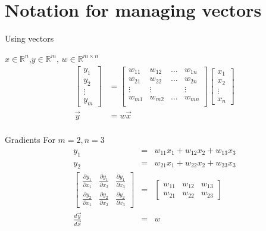 \section{Notation for managing vectors}
\begin{frame}{Using vectors}
		\begin{block}{$x \in \mathbb{R}^n$,$y \in \mathbb{R}^m$, $w\in \mathbb{R}^{m \times n}$}
			\begin{align*}
				\begin{bmatrix}
					y_1 \\
					y_2 \\
					\vdots \\
					y_m
				\end{bmatrix} & =  
				\begin{bmatrix}
					w_{11} & w_{12}& \dots & w_{1n}  \\
					w_{21} & w_{22}& \dots & w_{2n}  \\
					\vdots &\vdots &  & \vdots  \\
					w_{m1} & w_{m2}& \dots & w_{mn}  \\
				\end{bmatrix}
			\begin{bmatrix}
				x_1 \\
				x_2 \\
				\vdots \\
				x_n
			\end{bmatrix} \\
		\vec{y} &=w\vec{x} \\
			\end{align*}

		\end{block}
\end{frame}
\begin{frame}{Gradients}
	For $m=2, n=3$
	\begin{align}
		y_1 &=& w_{11}x_1 + w_{12}x_2+w_{13}x_3  \\
		y_2 &=& w_{21}x_1 + w_{22}x_2+w_{23}x_3  \\ 
		\begin{bmatrix}
			\frac{\partial y_1}{\partial x_1} & 
				\frac{\partial y_1}{\partial x_2}& 
				\frac{\partial y_1}{\partial x_3}  \\
			\frac{\partial y_2}{\partial x_1}  & 
				\frac{\partial y_2}{\partial x_2}  & 
				\frac{\partial y_2}{\partial x_3}  
		\end{bmatrix} &=& 
		\begin{bmatrix}
			w_{11} &  w_{12} & 	w_{13} \\
			w_{21} &  w_{22} & 	w_{23} 
		\end{bmatrix} \\
		\frac{d\vec{y}}{d\vec{x}} &=&w 
	\end{align}
\end{frame}
